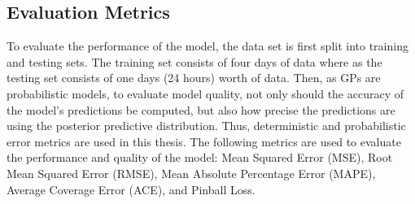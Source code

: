 \subsection{Evaluation Metrics}

To evaluate the performance of the model, the data set is first split into training and testing sets. The training set consists of four days of data where as the testing set consists of one days (24 hours) worth of data. Then, as GPs are probabilistic models, to evaluate model quality, not only should the accuracy of the model's predictions be computed, but also how precise the predictions are using the posterior predictive distribution. Thus, deterministic and probabilistic error metrics are used in this thesis. The following metrics are used to evaluate the performance and quality of the model: Mean Squared Error (MSE), Root Mean Squared Error (RMSE), Mean Absolute Percentage Error (MAPE), Average Coverage Error (ACE), and Pinball Loss.

